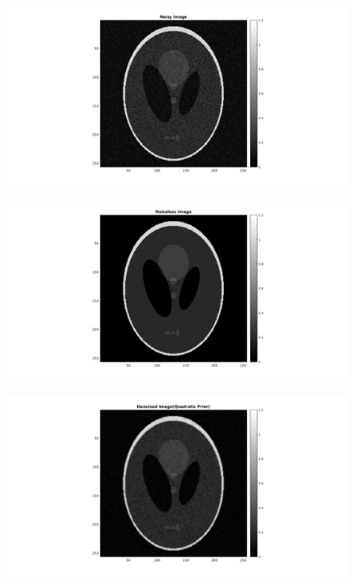 \documentclass[11pt]{article}
\begin{document}
\subsection{}
\begin{figure}[h]
\centering
\includegraphics[scale=0.5]{Noisy}
\end{figure}

\begin{figure}[h]
\centering
\includegraphics[scale=0.5]{Noiseless}
\end{figure}

\begin{figure}[h]
\centering
\includegraphics[scale=0.5]{DenoisedQuad}
\end{figure}
\end{document}
